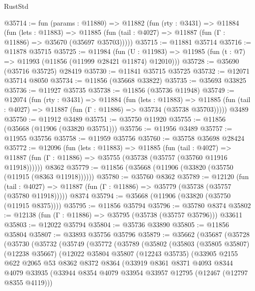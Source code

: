 \begin{lexlean}{RustStd}
\begin{coremodule}
@35714 := fun (params : @11880) =>
  @11882
    (fun (rty : @3431) =>
    @11884
      (fun (lets : @11883) =>
      @11885 (fun (tail : @4027) => @11887 (fun (Γ : @11886) => @35670 (@35697 @35703)))))
@35715 := @11881 @35714
@35716 := @11878 @35715
@35725 := @11984
    (fun (U : @11983) => @11985 (fun (t : @7) => @11993 (@11856 (@11999 @28421 @11874) @12010)))
@35728 := @35690 (@35716 @35725) @28419
@35730 := @11841 @35715 @35725
@35732 := @12071 @35714 @8050
@35734 := @11856 (@35668 @33822)
@35735 := @35693 @33825
@35736 := @11927 @35735
@35738 := @11856 (@35736 @11948)
@35749 := @12074
    (fun (rty : @3431) =>
    @11884
      (fun (lets : @11883) =>
      @11885 (fun (tail : @4027) => @11887 (fun (Γ : @11886) => @35734 (@35738 @35703)))))
    @3489
@35750 := @11912 @3489
@35751 := @35750 @11920
@35755 := @11856 (@35668 (@11906 (@33820 @35751)))
@35756 := @11956 @3489
@35757 := @11955 @35756
@35758 := @11959 @35756
@35760 := @35758 @35698 @28424
@35772 := @12096
    (fun (lets : @11883) =>
    @11885
      (fun (tail : @4027) =>
      @11887 (fun (Γ : @11886) => @35755 (@35738 (@35757 (@35760 @11916 @11918))))))
    @8362
@35779 := @11856 (@35668 (@11906 (@33820 (@35750 (@11915 (@8363 @11918))))))
@35780 := @35760 @8362
@35789 := @12120
    (fun (tail : @4027) => @11887 (fun (Γ : @11886) => @35779 (@35738 (@35757 (@35780 @11918)))))
    @8374
@35794 := @35668 (@11906 (@33820 (@35750 (@11915 @8375))))
@35795 := @11856 @35794
@35796 := @35780 @8374
@35802 := @12138 (fun (Γ : @11886) => @35795 (@35738 (@35757 @35796))) @33611
@35803 := @12022 @35794
@35804 := @35736 @33890
@35805 := @11856 @35804
@35807 := @33893 @35756 @35796
@35879 := @35662
    (@35687
      (@35728
        (@35730
          (@35732
            (@35749
              (@35772
                (@35789
                  (@35802
                    (@35803
                      (@35805 @35807)
                      (@12238 @35667)
                      (@12022
                        @35804
                        @35807
                        (@12243 @35735)
                        (@33905
                          @2155
                          @622
                          @2065
                          @53
                          @8362
                          @8372
                          @8364
                          (@33919
                            @8361
                            @8371
                            @4093
                            @8344
                            @4079
                            @33935
                            (@33944 @8354 @4079 @33954 @33957 @12795 (@12467 (@12797 @8355 @4119)))

\end{coremodule}
\end{lexlean}
